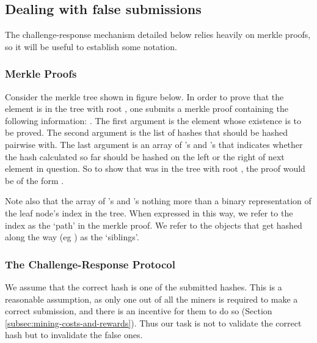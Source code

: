 \subsection{Dealing with false submissions}\label{sec:challengeresponse}
The challenge-response mechanism detailed below relies heavily on merkle proofs, so it will be useful to establish some notation.

\subsubsection{Merkle Proofs}
Consider the merkle tree shown in figure below. In order to prove that the element  is in the tree with root , one submits a merkle proof containing the following information: . The first argument is the element whose existence is to be proved. The second argument is the list of hashes that  should be hashed pairwise with. The last argument is an array of 's and 's that indicates whether the hash calculated so far should be hashed on the left or the right of next element in question. So to show that  was in the tree with root , the proof would be of the form .
\begin{center}
\end{center}
Note also that the array of 's and 's nothing more than a binary representation of the leaf node's index in the tree. When expressed in this way, we refer to the index as the `path' in the merkle proof. We refer to the objects that get hashed along the way (eg \ascode{[D,E]}) as the `siblings'.
%
\subsubsection{The Challenge-Response Protocol}
We assume that the correct hash is one of the  submitted hashes. This is a reasonable assumption, as only one out of all the miners is required to make a correct submission, and there is an incentive for them to do so (Section \ref{subsec:mining-costs-and-rewards}). Thus our task is not to validate the correct hash but to invalidate the false ones.

